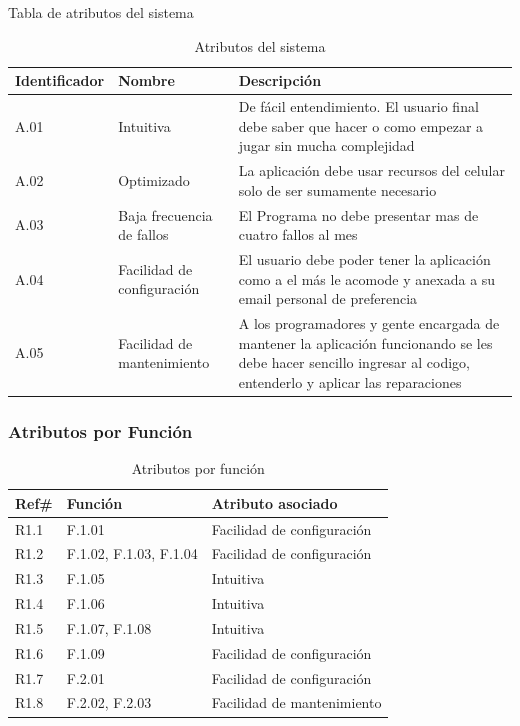Tabla de atributos del sistema
\begin{table}[H]
    \begin{center}
        \begin{tabular}{| m{2.3cm} | m{3.5cm} | m{10cm} |}        
        	\hline 
        	Identificador & Nombre & Descripción\\
        	\hline
        	A.01 & Intuitiva & De fácil entendimiento. El usuario final debe saber que hacer o como empezar a jugar sin mucha complejidad\\
        	\hline
        	A.02 & Optimizado & La aplicación debe usar recursos del celular solo de ser sumamente necesario\\
        	\hline
        	A.03 & Baja frecuencia de fallos & El Programa no debe presentar mas de cuatro fallos al mes\\
        	\hline
        	A.04 & Facilidad de configuración & El usuario debe poder tener la aplicación como a el más le acomode y anexada a su email personal de preferencia\\
        	\hline
        	A.05 & Facilidad de mantenimiento & A los programadores y gente encargada de mantener la aplicación funcionando se les debe hacer sencillo ingresar al codigo, entenderlo y aplicar las reparaciones\\
        	\hline
        \end{tabular}
    \caption{Atributos del sistema}
    \end{center}
\end{table}

\subsubsection{Atributos por Función}
\begin{table}[H]
    \begin{center}
        \begin{tabular}{| l | m{6cm} | m{6cm} |}        
        	\hline 
        	Ref\# & Función & Atributo asociado\\
        	\hline
        	R1.1 & F.1.01 & Facilidad de configuración\\
        	\hline
        	R1.2 & F.1.02, F.1.03, F.1.04 & Facilidad de configuración\\
        	\hline
        	R1.3 & F.1.05 & Intuitiva\\
        	\hline
        	R1.4 & F.1.06 & Intuitiva\\
        	\hline
        	R1.5 & F.1.07, F.1.08 & Intuitiva\\
        	\hline
        	R1.6 & F.1.09 & Facilidad de configuración\\
        	\hline
        	R1.7 & F.2.01 & Facilidad de configuración\\
        	\hline
        	R1.8 & F.2.02, F.2.03 & Facilidad de mantenimiento\\
        	\hline
        \end{tabular}
    \caption{Atributos por función}
    \end{center}
\end{table}
\newpage
